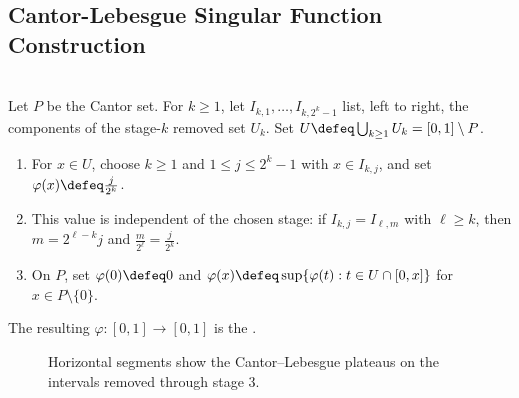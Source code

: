 \subsection{Cantor-Lebesgue Singular Function Construction}

\begin{definition} \label{def:cantor-lebesgue-singular-function-source} \\
Let $P$ be the Cantor set. For $k\geq1$, let $I_{k,1},\ldots,I_{k,2^k-1}$ list, left to right, the components of the stage-$k$ removed set $U_k$. Set $U\defeq\bigcup_{k\geq1}U_k=[0,1]\setminus P$.
\begin{enumerate}[label=(\roman*)]
\setlength{\itemsep}{0pt}
\item For $x\in U$, choose $k\geq1$ and $1\leq j\leq2^k-1$ with $x\in I_{k,j}$, and set $\varphi(x)\defeq\frac{j}{2^k}$.
\item This value is independent of the chosen stage: if $I_{k,j}=I_{\ell,m}$ with $\ell\geq k$, then $m=2^{\ell-k}j$ and $\frac{m}{2^\ell}=\frac{j}{2^k}$.
\item On $P$, set $\varphi(0)\defeq0$ and $\varphi(x)\defeq\sup\{\varphi(t):t\in U\cap[0,x]\}$ for $x\in P\setminus\{0\}$.
\end{enumerate}
The resulting $\varphi:[0,1]\to[0,1]$ is the .
\end{definition}

\begin{figure}[H]
  \centering
  
  \caption{Horizontal segments show the Cantor--Lebesgue plateaus on the intervals removed through stage $3$.}
  \label{fig:cantor-lebesgue-o3-plateaus}
\end{figure}

